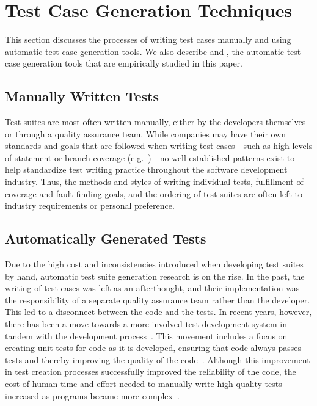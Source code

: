 
\section{Test Case Generation Techniques}
\label{sec:background}

This section discusses the processes of writing test cases manually and using automatic test case generation tools.  We also describe \codepro and \evo, the automatic test case generation tools that are empirically studied in this paper.

\subsection{Manually Written Tests}

Test suites are most often written manually, either by the developers themselves or through a quality assurance team.  While companies may have their own standards and goals that are followed when writing test cases---such as high levels of statement or branch coverage (e.g.~\cite{DO-178B, IEC61508})---no well-established patterns exist to help standardize test writing practice throughout the software development industry. Thus, the methods and styles of writing individual tests, fulfillment of coverage and fault-finding goals, and the ordering of test suites are often left to industry requirements or personal preference.  

\subsection{Automatically Generated Tests}

Due to the high cost and inconsistencies introduced when developing test suites by hand, automatic test suite generation research is on the rise.  In the past, the writing of test cases was left as an afterthought, and their implementation was the responsibility of a separate quality assurance team rather than the developer.  This led to a disconnect between the code and the tests.  In recent years, however, there has been a move towards a more involved test development system in tandem with the development process~\cite{Gelperin:1988:GST:62959.62965}.  This movement includes a focus on creating unit tests for code as it is developed, ensuring that code always passes tests and thereby improving the quality of the code~\cite{Canfora:2006:EAT:1159733.1159788}.  Although this improvement in test creation processes successfully improved the reliability of the code, the cost of human time and effort needed to manually write high quality tests increased as programs became more complex~\cite{clarke1998automated}. 

